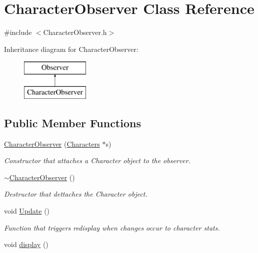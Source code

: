 \hypertarget{class_character_observer}{}\section{Character\+Observer Class Reference}
\label{class_character_observer}


{\ttfamily \#include $<$Character\+Observer.\+h$>$}

Inheritance diagram for Character\+Observer\+:\begin{figure}[H]
\begin{center}
\leavevmode
\includegraphics[height=2.000000cm]{class_character_observer}
\end{center}
\end{figure}
\subsection*{Public Member Functions}
\begin{DoxyCompactItemize}
\item 
\hypertarget{class_character_observer_a787323c17867c2362ebf1b00f6d20a58}{}\label{class_character_observer_a787323c17867c2362ebf1b00f6d20a58} 
\hyperlink{class_character_observer_a787323c17867c2362ebf1b00f6d20a58}{Character\+Observer} (\hyperlink{class_characters}{Characters} $\ast$s)
\begin{DoxyCompactList}\small\item\em Constructor that attaches a Character object to the observer. \end{DoxyCompactList}\item 
\hypertarget{class_character_observer_ac535a0d01c7ab57f41b933a9507116fb}{}\label{class_character_observer_ac535a0d01c7ab57f41b933a9507116fb} 
\hyperlink{class_character_observer_ac535a0d01c7ab57f41b933a9507116fb}{$\sim$\+Character\+Observer} ()
\begin{DoxyCompactList}\small\item\em Destructor that dettaches the Character object. \end{DoxyCompactList}\item 
\hypertarget{class_character_observer_a398d6d784065c7ed36c928d44a574630}{}\label{class_character_observer_a398d6d784065c7ed36c928d44a574630} 
void \hyperlink{class_character_observer_a398d6d784065c7ed36c928d44a574630}{Update} ()
\begin{DoxyCompactList}\small\item\em Function that triggers redisplay when changes occur to character stats. \end{DoxyCompactList}\item 
void \hyperlink{class_character_observer_af255a3fd431b55de8dd2ab9a639e546b}{display} ()
\end{DoxyCompactItemize}
